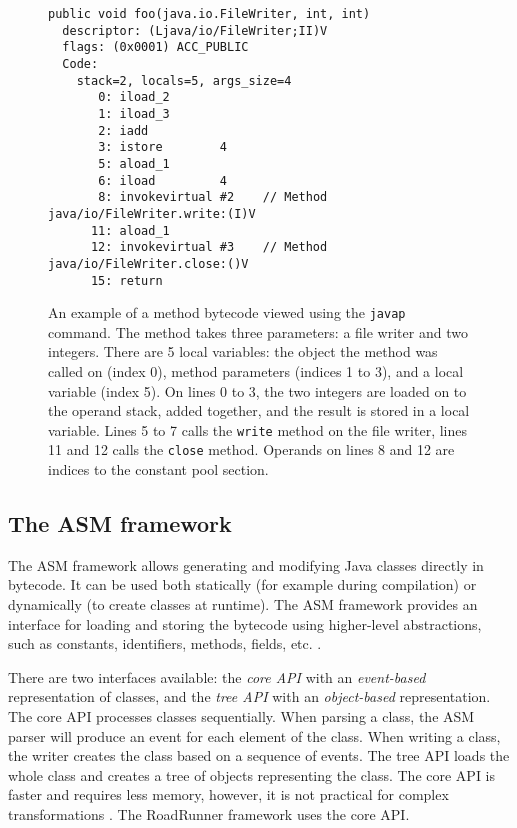 \begin{figure}[hbt]
    \label{bytecodeExample}
    \begin{lstlisting}
public void foo(java.io.FileWriter, int, int)
  descriptor: (Ljava/io/FileWriter;II)V
  flags: (0x0001) ACC_PUBLIC
  Code:
    stack=2, locals=5, args_size=4
       0: iload_2
       1: iload_3
       2: iadd
       3: istore        4
       5: aload_1
       6: iload         4
       8: invokevirtual #2    // Method java/io/FileWriter.write:(I)V
      11: aload_1
      12: invokevirtual #3    // Method java/io/FileWriter.close:()V
      15: return
    \end{lstlisting}
    \caption{An example of a method bytecode viewed using the \texttt{javap}
    command. The method takes three parameters: a file writer and two integers.
    There are 5 local variables: the object the method was called on (index 0),
    method parameters (indices 1 to 3), and a local variable (index 5). On lines
    0 to 3, the two integers are loaded on to the operand stack, added together,
    and the result is stored in a local variable. Lines 5 to 7 calls the
    \texttt{write} method on the file writer, lines 11 and 12 calls the
    \texttt{close} method. Operands on lines 8 and 12 are indices to the
    constant pool section.}
\end{figure}


\subsection{The ASM framework}

The ASM framework allows generating and modifying Java classes directly in
bytecode. It can be used both statically (for example during compilation) or
dynamically (to create classes at runtime). The ASM framework provides an
interface for loading and storing the bytecode using higher-level abstractions,
such as constants, identifiers, methods, fields, etc. \cite{asmguide}.

There are two interfaces available: the \emph{core API} with an
\emph{event-based} representation of classes, and the \emph{tree API} with an
\emph{object-based} representation. The core API processes classes sequentially.
When parsing a class, the ASM parser will produce an event for each element of
the class.  When writing a class, the writer creates the class based on a
sequence of events. The tree API loads the whole class and creates a tree of
objects representing the class. The core API is faster and requires less memory,
however, it is not practical for complex transformations \cite{asmguide}. The
RoadRunner framework uses the core API.

